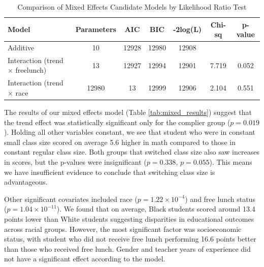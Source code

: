 \documentclass[11pt]{article}
\begin{document}
\begin{table}[htbp]
\centering
\caption{Comparison of Mixed Effects Candidate Models by Likelihood Ratio Test}
\label{tab:lrt}
\begin{tabular}{lcccccc}
\toprule
\textbf{Model} & \textbf{Parameters} & \textbf{AIC} & \textbf{BIC} & \textbf{-2log(L)} & \textbf{Chi-sq} & \textbf{p-value} \\
\midrule
Additive & 10 & 12928 & 12980 & 12908 & & \\ 
Interaction (trend $\times$ freelunch) & 13 & 12927 & 12994 & 12901 & 7.719 & 0.052 \\
Interaction (trend $\times$ race & 12980 & 13 & 12999 & 12906 & 2.104 & 0.551 \\
\bottomrule
\end{tabular}
\end{table}


The results of our mixed effects model (Table \ref{tab:mixed_results}) suggest that the trend effect was statistically significant only for the complier group ($p = 0.019$). Holding all other variables constant, we see that student who were in constant small class size scored on average 5.6 higher in math compared to those in constant regular class size. Both groups that switched class size also saw increases in scores, but the p-values were insignificant ($p = 0.338$, $p = 0.055$). This means we have insufficient evidence to conclude that switching class size is advantageous.

Other significant covariates included race ($p = 1.22 \times 10^{-4}$) and free lunch status ($p = 1.04 \times 10^{-11}$). We found that on average, Black students scored around 13.4 points lower than White students suggesting disparities in educational outcomes across racial groups. However, the most significant factor was socioeconomic status, with student who did not receive free lunch performing 16.6 points better than those who received free lunch. Gender and teacher years of experience did not have a significant effect according to the model.
\end{document}

